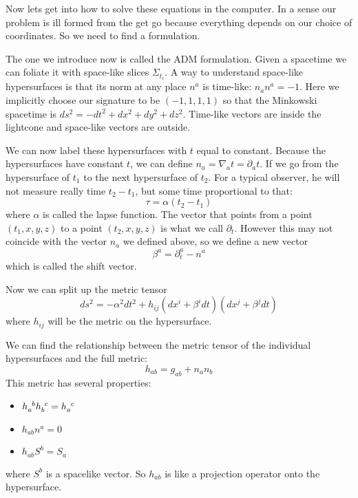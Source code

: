 \documentclass[letterpaper, 11pt]{article}
\numberwithin{equation}{section}
\numberwithin{figure}{section}
\begin{document}
Now lets get into how to solve these equations in the computer. In a sense our
problem is ill formed from the get go because everything depends on our choice
of coordinates. So we need to find a formulation.

The one we introduce now is called the ADM formulation. Given a spacetime we can
foliate it with space-like slices $\Sigma_{t_i}$. A way to understand space-like
hypersurfaces is that its norm at any place $n^{a}$ is time-like: $n_an^a = -1$.
Here we implicitly choose our signature to be $(-1, 1, 1, 1)$ so that the
Minkowski spacetime is $ds^2 = -dt^2 + dx^2 + dy^2 + dz^2$. Time-like vectors
are inside the lightcone and space-like vectors are outside.

We can now label these hypersurfaces with $t$ equal to constant. Because the
hypersurfaces have constant $t$, we can define $n_{a} = \nabla_at
= \partial_at$. If we go from the hypersurface of $t_{1}$ to the next
hypersurface of $t_2$. For a typical observer, he will not measure really time
$t_2 - t_1$, but some time proportional to that:
\begin{equation}
  \label{eq:16}
  \tau = \alpha(t_2 - t_1)
\end{equation}
where $\alpha$ is called the lapse function. The vector that points from a point
$(t_1, x, y, z)$ to a point $(t_2, x, y, z)$ is what we call $\partial_{t}$.
However this may not coincide with the vector $n_{a}$ we defined above, so we
define a new vector
\begin{equation}
  \label{eq:17}
  \beta^a = \partial_t^a - n^a
\end{equation}
which is called the shift vector.

Now we can split up the metric tensor
\begin{equation}
  \label{eq:18}
  ds^2 = -\alpha^2dt^2 + h_{ij}\left( dx^i + \beta^idt \right)(dx^j + \beta^jdt)
\end{equation}
where $h_{ij}$ will be the metric on the hypersurface.

We can find the relationship between the metric tensor of the individual
hypersurfaces and the full metric:
\begin{equation}
  \label{eq:19}
  h_{ab} = g_{ab} + n_an_{b}
\end{equation}
This metric has several properties:
\begin{itemize}
\item $\tensor{h}{_a^{b}}\tensor{h}{_{b}^{c}} = \tensor{h}{_{a}^{c}}$
    \item $h_{ab}n^a = 0$
    \item $h_{ab}S^{b} = S_{a}$
\end{itemize}
where $S^{b}$ is a spacelike vector. So $h_{ab}$ is like a projection operator
onto the hypersurface.
\end{document}
